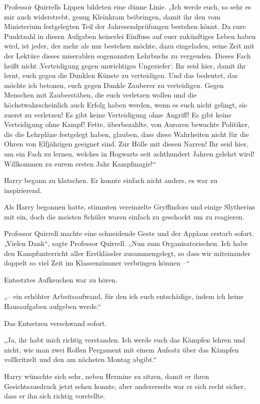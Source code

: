{Professor Quirrells Lippen bildeten eine dünne Linie. „Ich werde euch, so sehr es mir auch widerstrebt, genug Kleinkram beibringen, damit ihr den vom Ministerium festgelegten Teil der Jahresendprüfungen bestehen könnt. Da eure Punktzahl in diesen Aufgaben keinerlei Einfluss auf euer zukünftiges Leben haben wird, ist jeder, der mehr als nur bestehen möchte, dazu eingeladen, seine Zeit mit der Lektüre dieses miserablen sogenannten Lehrbuchs zu vergeuden. Dieses Fach heißt nicht ‚Verteidigung gegen unwichtiges Ungeziefer`. Ihr seid hier, damit ihr lernt, euch gegen die Dunklen Künste zu verteidigen. Und das bedeutet, das möchte ich betonen, euch gegen Dunkle Zauberer zu verteidigen. Gegen Menschen mit Zauberstäben, die euch verletzen wollen und die höchstwahrscheinlich auch Erfolg haben werden, wenn es euch nicht gelingt, sie zuerst zu verletzen! Es gibt keine Verteidigung ohne Angriff! Es gibt keine Verteidigung ohne Kampf! Fette, überbezahlte, von Auroren bewachte Politiker, die die Lehrpläne festgelegt haben, glauben, dass diese Wahrheiten nicht für die Ohren von Elfjährigen geeignet sind. Zur Hölle mit diesen Narren! Ihr seid hier, um ein Fach zu lernen, welches in Hogwarts seit achthundert Jahren gelehrt wird! Willkommen zu eurem ersten Jahr Kampfmagie!“

Harry begann zu klatschen. Er konnte einfach nicht anders, es war zu inspirierend.

Als Harry begonnen hatte, stimmten vereinzelte Gryffindors und einige Slytherins mit ein, doch die meisten Schüler waren einfach zu geschockt um zu reagieren.

Professor Quirrell machte eine schneidende Geste und der Applaus erstarb sofort. „Vielen Dank“, sagte Professor Quirrell. „Nun zum Organisatorischen. Ich habe den Kampfunterricht aller Erstklässler zusammengelegt, so dass wir miteinander doppelt so viel Zeit im Klassenzimmer verbringen können --“

Entsetztes Aufkeuchen war zu hören.

„-- ein erhöhter Arbeitsaufwand, für den ich euch entschädige, indem ich keine Hausaufgaben aufgeben werde.“

Das Entsetzen verschwand sofort.

„Ja, ihr habt mich richtig verstanden. Ich werde euch das Kämpfen lehren und nicht, wie man zwei Rollen Pergament mit einem Aufsatz über das Kämpfen vollkritzelt und den am nächsten Montag abgibt.“

Harry wünschte sich sehr, neben Hermine zu sitzen, damit er ihren Gesichtsausdruck jetzt sehen konnte, aber andererseits war er sich recht sicher, dass er ihn sich richtig vorstellte.

}
